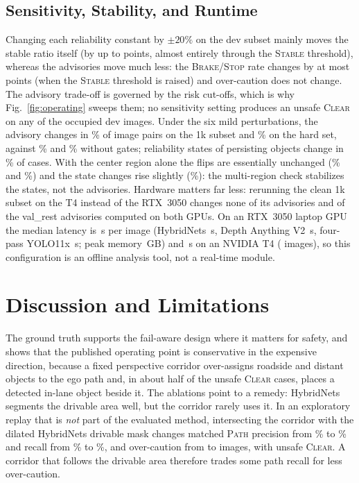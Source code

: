 \documentclass[conference,a4paper]{IEEEtran}
\newcommand{\st}[1]{\textsc{#1}}
\begin{document}
\subsection{Sensitivity, Stability, and Runtime}
\label{sec:sensitivity}
Changing each reliability constant by $\pm20\%$ on the dev subset mainly moves the stable ratio itself (by up to \SensRelStableDelta{} points, almost entirely through the \st{Stable} threshold), whereas the advisories move much less: the \st{Brake}/\st{Stop} rate changes by at most \SensRelSevereDelta{} points (when the \st{Stable} threshold is raised) and over-caution does not change. The advisory trade-off is governed by the risk cut-offs, which is why Fig.~\ref{fig:operating} sweeps them; no sensitivity setting produces an unsafe \st{Clear} on any of the \DevOccupied{} occupied dev images. Under the six mild perturbations, the advisory changes in \StdFlipFull\% of image pairs on the 1k subset and \FlipFull\% on the hard set, against \StdFlipNoGates\% and \FlipNoGates\% without gates; reliability states of persisting objects change in \StdStateFlipFull\% of cases. With the center region alone the flips are essentially unchanged (\StdFlipSingle\% and \FlipSingle\%) and the state changes rise slightly (\StdStateFlipSingle\%): the multi-region check stabilizes the states, not the advisories.\ifdefined\CrossHWFlipFull{} Hardware matters far less: rerunning the clean 1k subset on the T4 instead of the RTX~3050 changes none of its \CrossHWFlipPairsFull{} advisories\ifdefined\CrossHWValFlips{} and \CrossHWValFlips{} of the \CrossHWValPairs{} val\_rest advisories computed on both GPUs\fi.\fi{} On an RTX~3050 laptop GPU the median latency is \LatTotal\,s per image (HybridNets \LatHyb\,s, Depth Anything V2 \LatDepth\,s, four-pass YOLO11x \LatYolo\,s; peak memory \LatVRAM\,GB)\ifdefined\LatTFourTotal{} and \LatTFourTotal\,s on an NVIDIA T4 (\LatTFourImages{} images)\fi, so this configuration is an offline analysis tool, not a real-time module.

\section{Discussion and Limitations}
\label{sec:discussion}
The ground truth supports the fail-aware design where it matters for safety, and shows that the published operating point is conservative in the expensive direction, because a fixed perspective corridor over-assigns roadside and distant objects to the ego path\ifdefined\TestUnsafeDetected{} and, in about half of the unsafe \st{Clear} cases, places a detected in-lane object beside it\fi. The ablations point to a remedy: HybridNets segments the drivable area well, but the corridor rarely uses it. In an exploratory replay that is \emph{not} part of the evaluated method, intersecting the corridor with the dilated HybridNets drivable mask changes matched \st{Path} precision from \TestPathPrec\% to \TestExpPathPrec\% and recall from \TestPathRec\% to \TestExpPathRec\%, and over-caution from \TestOver{} to \TestExpOver{} images, with \TestExpUnsafe{} unsafe \st{Clear}. A corridor that follows the drivable area therefore trades some path recall for less over-caution.
\end{document}
